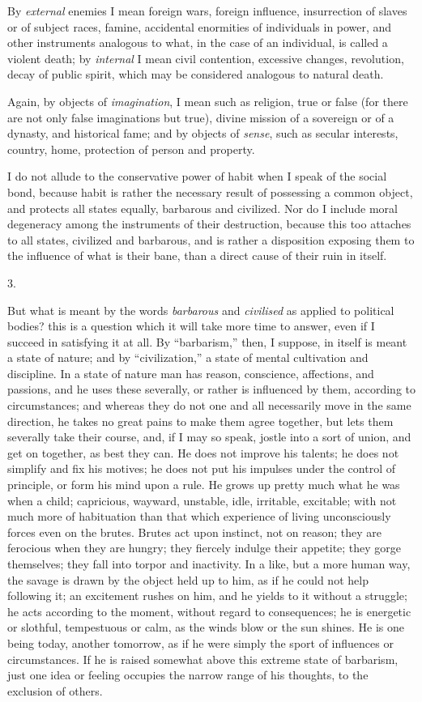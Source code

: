 By \emph{external} enemies I
mean foreign wars, foreign influence, insurrection of slaves or of
subject races, famine, accidental enormities of individuals in power,
and other instruments analogous to what, in the case of an individual,
is called a violent death; by \emph{internal} I mean civil contention,
excessive changes, revolution, decay of public spirit, which may be
considered analogous to natural death.

Again, by objects of \emph{imagination},
I mean such as religion, true or false (for there are not only false
imaginations but true), divine mission of a sovereign or of a dynasty,
and historical fame; and by objects of \emph{sense}, such as secular
interests, country, home, protection of person and property.

I do not allude to the
conservative power of habit when I speak of the social bond, because
habit is rather the necessary result of possessing a common object,
and protects all states equally, barbarous and civilized. Nor do I
include moral degeneracy among the instruments of their
destruction, because this too attaches to all states, civilized and
barbarous, and is rather a disposition exposing them to the influence
of what is their bane, than a direct cause of their ruin in itself.

3.

But what is meant by the words
\emph{barbarous} and \emph{civilised} as applied to political bodies?
this is a question which it will take more time to answer, even if I
succeed in satisfying it at all. By ``barbarism,'' then, I suppose, in
itself is meant a state of nature; and by ``civilization,'' a state of
mental cultivation and discipline. In a state of nature man has
reason, conscience, affections, and passions, and he uses these
severally, or rather is influenced by them, according to
circumstances; and whereas they do not one and all necessarily move in
the same direction, he takes no great pains to make them agree
together, but lets them severally take their course, and, if I may so
speak, jostle into a sort of union, and get on together, as best they
can. He does not improve his talents; he does not simplify and fix his
motives; he does not put his impulses under the control of principle,
or form his mind upon a rule. He grows up pretty much what he was when
a child; capricious, wayward, unstable, idle, irritable, excitable;
with not much more of habituation than that which experience of living
unconsciously forces even on the brutes. Brutes act upon instinct, not
on reason; they are ferocious when they are hungry; they fiercely
indulge their appetite; they gorge themselves; they fall into torpor
and inactivity. In a like, but a more human way, the savage is drawn
by the object held up to him, as if he could not help following it; an
excitement rushes on him, and he yields to it without a struggle;
he acts according to the moment, without regard to consequences;
he is energetic or slothful, tempestuous or calm, as the winds blow or
the sun shines. He is one being today, another tomorrow, as if he were
simply the sport of influences or circumstances. If he is raised
somewhat above this extreme state of barbarism, just one idea or
feeling occupies the narrow range of his thoughts, to the exclusion of
others.

